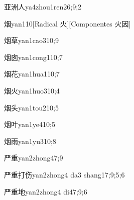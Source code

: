\begin{verbete}{亚洲人}{ya4zhou1ren2}{6;9;2}
\end{verbete}

\begin{verbete}{烟}{yan1}{10}[Radical 火][Componentes 火因]
\end{verbete}

\begin{verbete}{烟草}{yan1cao3}{10;9}
\end{verbete}

\begin{verbete}{烟囱}{yan1cong1}{10;7}
\end{verbete}

\begin{verbete}{烟花}{yan1hua1}{10;7}
\end{verbete}

\begin{verbete}{烟火}{yan1huo3}{10;4}
\end{verbete}

\begin{verbete}{烟头}{yan1tou2}{10;5}
\end{verbete}

\begin{verbete}{烟叶}{yan1ye4}{10;5}
\end{verbete}

\begin{verbete}{烟雨}{yan1yu3}{10;8}
\end{verbete}

\begin{verbete}{严重}{yan2zhong4}{7;9}
\end{verbete}

\begin{verbete}{严重打伤}{yan2zhong4 da3 shang1}{7;9;5;6}
\end{verbete}

\begin{verbete}{严重地}{yan2zhong4 di4}{7;9;6}
\end{verbete}


